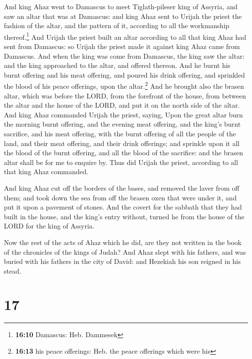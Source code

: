  And king Ahaz went to Damascus to meet Tiglath-pileser
king of Assyria, and saw an altar that was at Damascus: and king Ahaz
sent to Urijah the priest the fashion of the altar, and the pattern of
it, according to all the workmanship thereof.\footnote{\textbf{16:10}
  Damascus: Heb. Dammesek}  And Urijah the priest built
an altar according to all that king Ahaz had sent from Damascus: so
Urijah the priest made it against king Ahaz came from Damascus.
 And when the king was come from Damascus, the king saw
the altar: and the king approached to the altar, and offered thereon.
 And he burnt his burnt offering and his meat offering,
and poured his drink offering, and sprinkled the blood of his peace
offerings, upon the altar.\footnote{\textbf{16:13} his peace offerings:
  Heb. the peace offerings which were his}  And he
brought also the brasen altar, which was before the LORD, from the
forefront of the house, from between the altar and the house of the
LORD, and put it on the north side of the altar.  And
king Ahaz commanded Urijah the priest, saying, Upon the great altar burn
the morning burnt offering, and the evening meat offering, and the
king's burnt sacrifice, and his meat offering, with the burnt offering
of all the people of the land, and their meat offering, and their drink
offerings; and sprinkle upon it all the blood of the burnt offering, and
all the blood of the sacrifice: and the brasen altar shall be for me to
enquire by.  Thus did Urijah the priest, according to all
that king Ahaz commanded.

 And king Ahaz cut off the borders of the bases, and
removed the laver from off them; and took down the sea from off the
brasen oxen that were under it, and put it upon a pavement of stones.
 And the covert for the sabbath that they had built in
the house, and the king's entry without, turned he from the house of the
LORD for the king of Assyria.

 Now the rest of the acts of Ahaz which he did, are they
not written in the book of the chronicles of the kings of Judah?
 And Ahaz slept with his fathers, and was buried with his
fathers in the city of David: and Hezekiah his son reigned in his stead.

\hypertarget{section-16}{%
\section{17}\label{section-16}}


